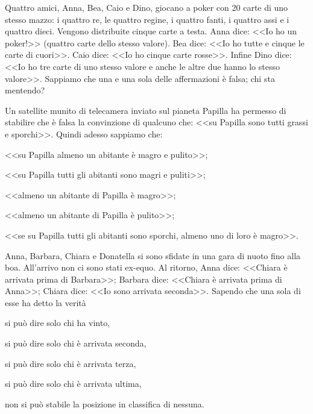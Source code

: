 \begin{esercizio}
\label{ese:0.22}
Quattro amici, Anna, Bea, Caio e Dino, giocano a poker con 20 carte di uno stesso mazzo: i quattro re, le quattro regine, i quattro fanti, i quattro assi e i quattro dieci. Vengono distribuite cinque carte a testa. Anna dice: <<Io ho un poker!>> (quattro carte dello stesso valore). Bea dice: <<Io ho tutte e cinque le carte di cuori>>. Caio dice: <<Io ho cinque carte rosse>>. Infine Dino dice: <<Io ho tre carte di uno stesso valore e anche le altre due hanno lo stesso valore>>. Sappiamo che una e una sola delle affermazioni è falsa; chi sta mentendo?
\end{esercizio}

\begin{esercizio}
\label{ese:0.23}
Un satellite munito di telecamera inviato sul pianeta Papilla ha permesso di stabilire che è falsa la convinzione di qualcuno che: <<su Papilla sono tutti grassi e sporchi>>. Quindi adesso sappiamo che:
\begin{enumeratea}
\item <<su Papilla almeno un abitante è magro e pulito>>;
\item <<su Papilla tutti gli abitanti sono magri e puliti>>;
\item <<almeno un abitante di Papilla è magro>>;
\item <<almeno un abitante di Papilla è pulito>>;
\item <<se su Papilla tutti gli abitanti sono sporchi, almeno uno di loro è magro>>.
\end{enumeratea}
\end{esercizio}

\begin{esercizio}
\label{ese:0.24}
Anna, Barbara, Chiara e Donatella si sono sfidate in una gara di nuoto fino alla boa. All'arrivo non ci sono stati ex-equo. Al ritorno, Anna dice: <<Chiara è arrivata prima di Barbara>>; Barbara dice: <<Chiara è arrivata prima di Anna>>; Chiara dice: <<Io sono arrivata seconda>>. Sapendo che una sola di esse ha detto la verità
\begin{enumeratea}
\item si può dire solo chi ha vinto, 
\item si può dire solo chi è arrivata seconda, 
\item si può dire solo chi è arrivata terza, 
\item si può dire solo chi è arrivata ultima, 
\item non si può stabile la posizione in classifica di nessuna. 
\end{enumeratea}
\end{esercizio}

